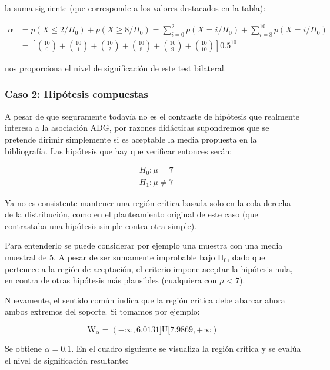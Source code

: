 \documentclass[
]{article}
\begin{document}
la suma siguiente (que corresponde a los valores destacados en la tabla):

\[
\begin{aligned}
\alpha & =p\left(X \leq 2 / H_{0}\right)+p\left(X \geq 8 / H_{0}\right)=\sum_{i=0}^{2} p\left(X=i / H_{0}\right)+\sum_{i=8}^{10} p\left(X=i / H_{0}\right) \\
& =\left[\binom{10}{0}+\binom{10}{1}+\binom{10}{2}+\binom{10}{8}+\binom{10}{9}+\binom{10}{10}\right] 0.5^{10}
\end{aligned}
\]

nos proporciona el nivel de significación de este test bilateral.

\subsubsection{Caso 2: Hipótesis compuestas}\label{caso-2-hipuxf3tesis-compuestas}

A pesar de que seguramente todavía no es el contraste de hipótesis que realmente interesa a la asociación ADG, por razones didácticas supondremos que se pretende dirimir simplemente si es aceptable la media propuesta en la bibliografía. Las hipótesis que hay que verificar entonces serán:

\[
\begin{aligned}
& H_{0}: \mu=7 \\
& H_{1}: \mu \neq 7
\end{aligned}
\]

Ya no es consistente mantener una región crítica basada solo en la cola derecha de la distribución, como en el planteamiento original de este caso (que contrastaba una hipótesis simple contra otra simple).

Para entenderlo se puede considerar por ejemplo una muestra con una media muestral de 5. A pesar de ser sumamente improbable bajo \(\mathrm{H}_{0}\), dado que pertenece a la región de aceptación, el criterio impone aceptar la hipótesis nula, en contra de otras hipótesis más plausibles (cualquiera con \(\mu<7\)).

Nuevamente, el sentido común indica que la región crítica debe abarcar ahora ambos extremos del soporte. Si tomamos por ejemplo:

\[
\mathrm{W}_{\alpha}=(-\infty, 6.0131] \mathrm{U}[7.9869,+\infty)
\]

Se obtiene \(\alpha=0.1\). En el cuadro siguiente se visualiza la región crítica y se evalúa el nivel de significación resultante:
\end{document}
